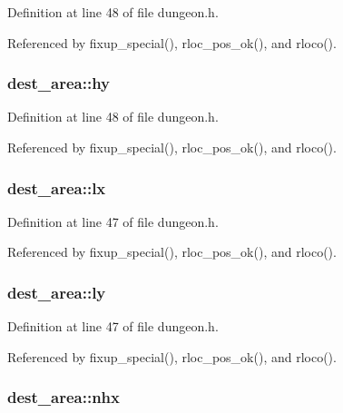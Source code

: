 Definition at line 48 of file dungeon.\+h.



Referenced by fixup\+\_\+special(), rloc\+\_\+pos\+\_\+ok(), and rloco().

\hypertarget{structdest__area_a49f5641f3f9a1fd5dc7a99e965ff68a1}{
\subsubsection[{hy}]{ dest\+\_\+area\+::hy}}\label{structdest__area_a49f5641f3f9a1fd5dc7a99e965ff68a1}


Definition at line 48 of file dungeon.\+h.



Referenced by fixup\+\_\+special(), rloc\+\_\+pos\+\_\+ok(), and rloco().

\hypertarget{structdest__area_a5932983ba18a545f7aec082d215a39ec}{
\subsubsection[{lx}]{ dest\+\_\+area\+::lx}}\label{structdest__area_a5932983ba18a545f7aec082d215a39ec}


Definition at line 47 of file dungeon.\+h.



Referenced by fixup\+\_\+special(), rloc\+\_\+pos\+\_\+ok(), and rloco().

\hypertarget{structdest__area_a3788f34449db2f679cda4d9d6c42ba7a}{
\subsubsection[{ly}]{ dest\+\_\+area\+::ly}}\label{structdest__area_a3788f34449db2f679cda4d9d6c42ba7a}


Definition at line 47 of file dungeon.\+h.



Referenced by fixup\+\_\+special(), rloc\+\_\+pos\+\_\+ok(), and rloco().

\hypertarget{structdest__area_ad1a0692d1789df6ffa4a736f6e70cfed}{
\subsubsection[{nhx}]{ dest\+\_\+area\+::nhx}}\label{structdest__area_ad1a0692d1789df6ffa4a736f6e70cfed}


